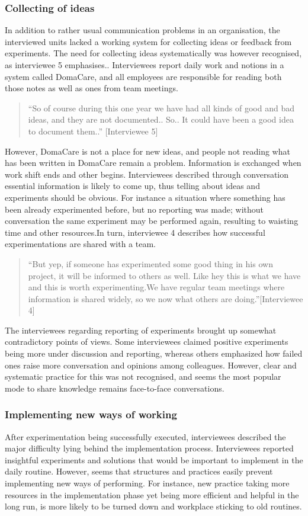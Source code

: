 \subsubsection{Collecting of ideas}
In addition to rather usual communication problems in an organisation, the interviewed units lacked a working system for collecting ideas or feedback from experiments. The need for collecting ideas systematically was however recognised, as interviewee 5 emphasises.. Interviewees report daily work and notions in a system called DomaCare, and all employees are responsible for reading both those notes as well as ones from team meetings. 
\begin{quote}
``So of course during this one year we have had all kinds of good and bad ideas, and they are not documented.. So.. It could have been a good idea to document them..'' [Interviewee 5]
\end{quote}
However, DomaCare is not a place for new ideas, and people not reading what has been written in DomaCare remain a problem. Information is exchanged when work shift ends and other begins. Interviewees described through conversation essential information is likely to come up, thus telling about ideas and experiments should be obvious. For instance a situation where something has been already experimented before, but no reporting was made; without conversation the same experiment may be performed again, resulting to waisting time and other resources.In turn, interviewee 4 describes how successful experimentations are shared with a team. 
\begin{quote}
``But yep, if someone has experimented some good thing in his own project, it will be informed to others as well. Like hey this is what we have and this is worth experimenting.We have regular team meetings where information is shared widely, so we now what others are doing.''[Interviewee 4]
\end{quote}
The interviewees regarding reporting of experiments brought up somewhat contradictory points of views. Some interviewees claimed positive experiments being more under discussion and reporting, whereas others emphasized how failed ones raise more conversation and opinions among colleagues. However, clear and systematic practice for this was not recognised, and seems the most popular mode to share knowledge remains face-to-face conversations.

\subsubsection{Implementing new ways of working}
After experimentation being successfully executed, interviewees described the major difficulty lying behind the implementation process. Interviewees reported insightful experiments and solutions that would be important to implement in the daily routine. However, seems that structures and practices easily prevent implementing new ways of performing. For instance, new practice taking more resources in the implementation phase yet being more efficient and helpful in the long run, is more likely to be turned down and workplace sticking to old routines. 

